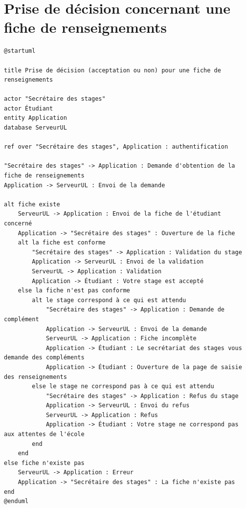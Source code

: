 \documentclass[11pt, a4paper]{report}
\begin{document}
\section*{Prise de décision concernant une fiche de renseignements}
\begin{verbatim}
@startuml

title Prise de décision (acceptation ou non) pour une fiche de renseignements

actor "Secrétaire des stages"
actor Étudiant
entity Application
database ServeurUL

ref over "Secrétaire des stages", Application : authentification

"Secrétaire des stages" -> Application : Demande d'obtention de la fiche de renseignements
Application -> ServeurUL : Envoi de la demande 

alt fiche existe
	ServeurUL -> Application : Envoi de la fiche de l'étudiant concerné
	Application -> "Secrétaire des stages" : Ouverture de la fiche
	alt la fiche est conforme
		"Secrétaire des stages" -> Application : Validation du stage
		Application -> ServeurUL : Envoi de la validation
		ServeurUL -> Application : Validation
		Application -> Étudiant : Votre stage est accepté
	else la fiche n'est pas conforme
		alt le stage correspond à ce qui est attendu
			"Secrétaire des stages" -> Application : Demande de complément
			Application -> ServeurUL : Envoi de la demande
			ServeurUL -> Application : Fiche incomplète
			Application -> Étudiant : Le secrétariat des stages vous demande des compléments
			Application -> Étudiant : Ouverture de la page de saisie des renseignements
		else le stage ne correspond pas à ce qui est attendu
			"Secrétaire des stages" -> Application : Refus du stage
			Application -> ServeurUL : Envoi du refus
			ServeurUL -> Application : Refus
			Application -> Étudiant : Votre stage ne correspond pas aux attentes de l'école
		end
	end
else fiche n'existe pas
	ServeurUL -> Application : Erreur
	Application -> "Secrétaire des stages" : La fiche n'existe pas
end
@enduml
\end{verbatim}
\end{document}
